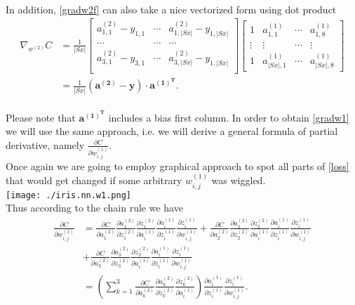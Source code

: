 \documentclass[12pt,titlepage]{article}
\begin{document}
\\
In addition, \eqref{gradw2f} can also take a nice vectorized form using dot product
\begin{equation} \label{gradw2f2}
\begin{split}
\nabla_{w^{(2)}}C&=\frac{1}{|Sx|}\begin{bmatrix}
 a_{1,1}^{(2)}-y_{1,1}& \cdots &a_{1,|Sx|}^{(2)}-y_{1,|Sx|} \\ 
 \cdots& \cdots &\cdots \\
 a_{3,1}^{(2)}-y_{3,1}& \cdots &a_{3,|Sx|}^{(2)}-y_{1,|Sx|} \\
\end{bmatrix}\begin{bmatrix}
 1& a_{1,1}^{(1)} & \cdots &a_{1,8}^{(1)} \\ 
 \vdots& \vdots & \cdots & \vdots \\ 
 1& a_{|Sx|,1}^{(1)} & \cdots  & a_{|Sx|,8}^{(1)}
\end{bmatrix}\\
&=\frac{1}{|Sx|}(\mathbf{a^{(2)}}-\mathbf{y})\cdot\mathbf{a^{(1)^{T}}}.
\end{split}
\end{equation}
\\Please note that $\mathbf{a^{(1)^{T}}}$ includes a bias first column.
\newpage 
In order to obtain \eqref{gradw1} we will use the same approach, i.e. we will derive a general formula of partial derivative, namely $\frac{\partial C}{\partial w_{i,j}^{(1)}}$. \\
Once again we are going to employ graphical approach to spot all parts of \eqref{loss} that would get changed if some arbitrary $w_{i,j}^{(1)}$ was wiggled.\\
\texttt{[image: ./iris.nn.w1.png]}
\\Thus according to the chain rule we have\\
\begin{equation} \label{chain1}
\begin{split}
\frac{\partial C}{\partial w_{i,j}^{(1)}}
&=\frac{\partial C}{\partial a_{1}^{(2)}}\frac{\partial a_{1}^{(2)}}{\partial z_{1}^{(2)}}\frac{\partial z_{1}^{(2)}}{\partial a_{i}^{(1)}}\frac{\partial a_{i}^{(1)}}{\partial z_{i}^{(1)}}\frac{\partial z_{i}^{(1)}}{\partial w_{i,j}^{(1)}}
+\frac{\partial C}{\partial a_{2}^{(2)}}\frac{\partial a_{2}^{(2)}}{\partial z_{2}^{(2)}}\frac{\partial z_{2}^{(2)}}{\partial a_{i}^{(1)}}\frac{\partial a_{i}^{(1)}}{\partial z_{i}^{(1)}}\frac{\partial z_{i}^{(1)}}{\partial w_{i,j}^{(1)}}\\
&+\frac{\partial C}{\partial a_{3}^{(2)}}\frac{\partial a_{3}^{(2)}}{\partial z_{3}^{(2)}}\frac{\partial z_{3}^{(2)}}{\partial a_{i}^{(1)}}\frac{\partial a_{i}^{(1)}}{\partial z_{i}^{(1)}}\frac{\partial z_{i}^{(1)}}{\partial w_{i,j}^{(1)}}\\
&=\left( \sum_{k=1}^{3}\frac{\partial C}{\partial a_{k}^{(2)}}\frac{\partial a_{k}^{(2)}}{\partial z_{k}^{(2)}}\frac{\partial z_{k}^{(2)}}{\partial a_{i}^{(1)}}\right )\frac{\partial a_{i}^{(1)}}{\partial z_{i}^{(1)}}\frac{\partial z_{i}^{(1)}}{\partial w_{i,j}^{(1)}}.
\end{split}
\end{equation}
\end{document}
